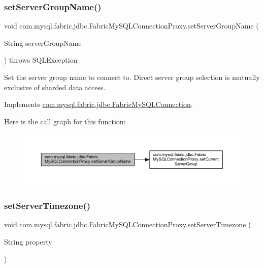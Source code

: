 \subsubsection{\texorpdfstring{set\+Server\+Group\+Name()}{setServerGroupName()}}
{\footnotesize\ttfamily void com.\+mysql.\+fabric.\+jdbc.\+Fabric\+My\+S\+Q\+L\+Connection\+Proxy.\+set\+Server\+Group\+Name (\begin{DoxyParamCaption}\item[{String}]{server\+Group\+Name }\end{DoxyParamCaption}) throws S\+Q\+L\+Exception}

Set the server group name to connect to. Direct server group selection is mutually exclusive of sharded data access. 

Implements \mbox{\hyperlink{interfacecom_1_1mysql_1_1fabric_1_1jdbc_1_1_fabric_my_s_q_l_connection_a934f2eca033d68725f572ceab4585efc}{com.\+mysql.\+fabric.\+jdbc.\+Fabric\+My\+S\+Q\+L\+Connection}}.

Here is the call graph for this function\+:\nopagebreak
\begin{figure}[H]
\begin{center}
\leavevmode
\includegraphics[width=350pt]{classcom_1_1mysql_1_1fabric_1_1jdbc_1_1_fabric_my_s_q_l_connection_proxy_a288c67fc74fabc15a7a108d28ff6c52b_cgraph}
\end{center}
\end{figure}
\mbox{\label{classcom_1_1mysql_1_1fabric_1_1jdbc_1_1_fabric_my_s_q_l_connection_proxy_a8192c3c5e239f5f1691c61353752dbd5}} 
\subsubsection{\texorpdfstring{set\+Server\+Timezone()}{setServerTimezone()}}
{\footnotesize\ttfamily void com.\+mysql.\+fabric.\+jdbc.\+Fabric\+My\+S\+Q\+L\+Connection\+Proxy.\+set\+Server\+Timezone (\begin{DoxyParamCaption}\item[{String}]{property }\end{DoxyParamCaption})}


